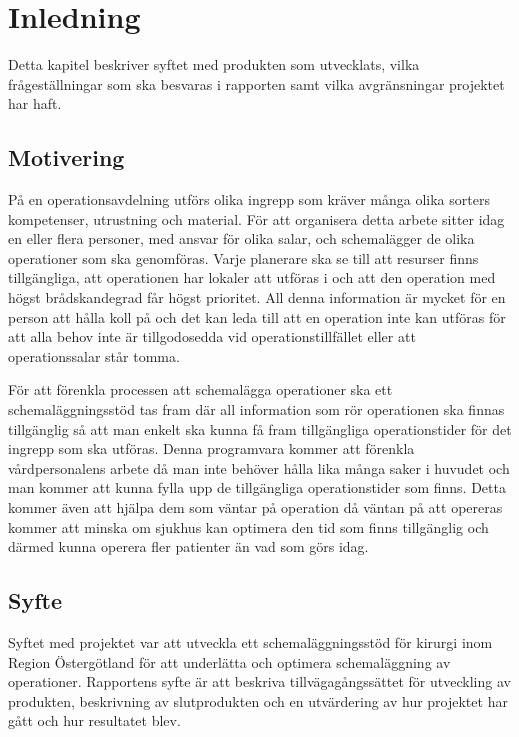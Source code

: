 \chapter{Inledning}
Detta kapitel beskriver syftet med produkten som utvecklats, vilka frågeställningar som ska besvaras i rapporten samt vilka avgränsningar projektet har haft.

\section{Motivering}
På en operationsavdelning utförs olika ingrepp som kräver många olika sorters kompetenser, utrustning och material. För att organisera detta arbete sitter 
idag en eller flera personer, med ansvar för olika salar, och schemalägger de olika operationer som ska genomföras. Varje planerare ska se till att 
resurser finns tillgängliga, att operationen har lokaler att utföras i och att den operation med högst brådskandegrad får högst prioritet. All denna information är 
mycket för en person att hålla koll på och det kan leda till att en operation inte kan utföras för att alla behov inte är tillgodosedda vid operationstillfället 
eller att operationssalar står tomma.

För att förenkla processen att schemalägga operationer ska ett schemaläggningsstöd tas fram där all information som rör operationen ska finnas 
tillgänglig så att man enkelt ska kunna få fram tillgängliga operationstider för det ingrepp som ska utföras. Denna programvara kommer att förenkla 
vårdpersonalens arbete då man inte behöver hålla lika många saker i huvudet och man kommer att kunna fylla upp de tillgängliga operationstider som finns. 
Detta kommer även att hjälpa dem som väntar på operation då väntan på att opereras kommer att minska om sjukhus kan optimera den tid som finns tillgänglig och 
därmed kunna operera fler patienter än vad som görs idag.

\section{Syfte}
Syftet med projektet var att utveckla ett schemaläggningsstöd för kirurgi inom Region Östergötland för att underlätta och optimera schemaläggning av operationer.
Rapportens syfte är att beskriva tillvägagångssättet för utveckling av produkten, beskrivning av slutprodukten och en utvärdering av hur projektet har gått och hur resultatet blev.

